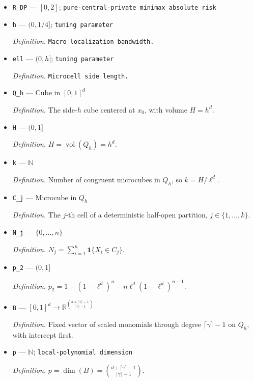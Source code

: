 \documentclass{article}
\begin{document}
\begin{itemize}
  \item \texttt{R\_\allowbreak{}DP} --- \([0,2]\); \texttt{pure-\allowbreak{}central-\allowbreak{}private minimax absolute risk}
  \item \texttt{h} --- \((0,1/4]\); \texttt{tuning parameter}
  \par\smallskip\noindent\emph{Definition.} \texttt{Macro localization bandwidth.}
  \item \texttt{ell} --- \((0,h]\); \texttt{tuning parameter}
  \par\smallskip\noindent\emph{Definition.} \texttt{Microcell side length.}
  \item \texttt{Q\_\allowbreak{}h} --- Cube in \([0,1]^d\)
  \par\smallskip\noindent\emph{Definition.} The side-\(h\) cube centered at \(x_0\), with volume \(H=h^d\).
  \item \texttt{H} --- \((0,1]\)
  \par\smallskip\noindent\emph{Definition.} \(H=\operatorname{vol}(Q_h)=h^d\).
  \item \texttt{k} --- \(\mathbb N\)
  \par\smallskip\noindent\emph{Definition.} Number of congruent microcubes in \(Q_h\), so \(k=H/\ell^d\).
  \item \texttt{C\_\allowbreak{}j} --- Microcube in \(Q_h\)
  \par\smallskip\noindent\emph{Definition.} The \(j\)-th cell of a deterministic half-open partition, \(j\in\{1,\ldots,k\}\).
  \item \texttt{N\_\allowbreak{}j} --- \(\{0,\ldots,n\}\)
  \par\smallskip\noindent\emph{Definition.} \(N_j=\sum_{i=1}^n\mathbf 1\{X_i\in C_j\}\).
  \item \texttt{p\_\allowbreak{}2} --- \((0,1]\)
  \par\smallskip\noindent\emph{Definition.} \(p_2=1-(1-\ell^d)^n-n\ell^d(1-\ell^d)^{n-1}\).
  \item \texttt{B} --- \([0,1]^d\to\mathbb R^{\binom{d+\lceil\gamma\rceil-1}{\lceil\gamma\rceil-1}}\)
  \par\smallskip\noindent\emph{Definition.} Fixed vector of scaled monomials through degree \(\lceil\gamma\rceil-1\) on \(Q_h\), with intercept first.
  \item \texttt{p} --- \(\mathbb N\); \texttt{local-\allowbreak{}polynomial dimension}
  \par\smallskip\noindent\emph{Definition.} \(p=\dim(B)=\binom{d+\lceil\gamma\rceil-1}{\lceil\gamma\rceil-1}\).

\end{itemize}
\end{document}
